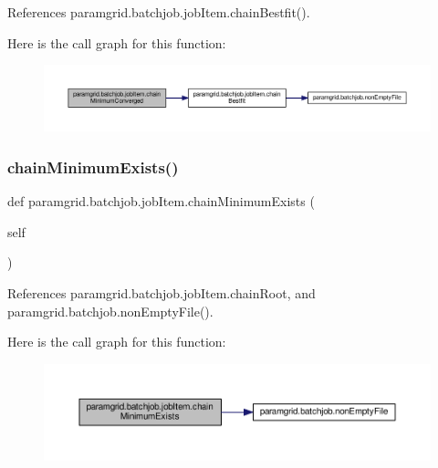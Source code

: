References paramgrid.\+batchjob.\+job\+Item.\+chain\+Bestfit().

Here is the call graph for this function\+:
\nopagebreak
\begin{figure}[H]
\begin{center}
\leavevmode
\includegraphics[width=350pt]{classparamgrid_1_1batchjob_1_1jobItem_a7c3b8c96fddc1cf62fd8d9b1a3f8cda7_cgraph}
\end{center}
\end{figure}
\mbox{\label{classparamgrid_1_1batchjob_1_1jobItem_af071571611898c1f7cf01209710bcd85}} 
\subsubsection{\texorpdfstring{chain\+Minimum\+Exists()}{chainMinimumExists()}}
{\footnotesize\ttfamily def paramgrid.\+batchjob.\+job\+Item.\+chain\+Minimum\+Exists (\begin{DoxyParamCaption}\item[{}]{self }\end{DoxyParamCaption})}



References paramgrid.\+batchjob.\+job\+Item.\+chain\+Root, and paramgrid.\+batchjob.\+non\+Empty\+File().

Here is the call graph for this function\+:
\nopagebreak
\begin{figure}[H]
\begin{center}
\leavevmode
\includegraphics[width=350pt]{classparamgrid_1_1batchjob_1_1jobItem_af071571611898c1f7cf01209710bcd85_cgraph}
\end{center}
\end{figure}
\mbox{\label{classparamgrid_1_1batchjob_1_1jobItem_a94c6718acb448e4fe0a55ef0e80cf594}} 
